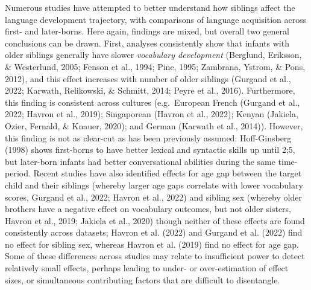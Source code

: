 \documentclass[
  man,mask,floatsintext]{apa6}
\begin{document}
Numerous studies have attempted to better understand how siblings affect the language development trajectory, with comparisons of language acquisition across first- and later-borns. Here again, findings are mixed, but overall two general conclusions can be drawn. First, analyses consistently show that infants with older siblings generally have slower \emph{vocabulary development} (Berglund, Eriksson, \& Westerlund, 2005; Fenson et al., 1994; Pine, 1995; Zambrana, Ystrom, \& Pons, 2012), and this effect increases with number of older siblings (Gurgand et al., 2022; Karwath, Relikowski, \& Schmitt, 2014; Peyre et al., 2016). Furthermore, this finding is consistent across cultures (e.g.~European French (Gurgand et al., 2022; Havron et al., 2019); Singaporean (Havron et al., 2022); Kenyan (Jakiela, Ozier, Fernald, \& Knauer, 2020); and German (Karwath et al., 2014)). However, this finding is not as clear-cut as has been previously assumed: Hoff-Ginsberg (1998) shows first-borns to have better lexical and syntactic skills up until 2;5, but later-born infants had better conversational abilities during the same time-period. Recent studies have also identified effects for age gap between the target child and their siblings (whereby larger age gaps correlate with lower vocabulary scores, Gurgand et al., 2022; Havron et al., 2022) and sibling sex (whereby older brothers have a negative effect on vocabulary outcomes, but not older sisters, Havron et al., 2019; Jakiela et al., 2020) though neither of these effects are found consistently across datasets; Havron et al. (2022) and Gurgand et al. (2022) find no effect for sibling sex, whereas Havron et al. (2019) find no effect for age gap. Some of these differences across studies may relate to insufficient power to detect relatively small effects, perhaps leading to under- or over-estimation of effect sizes, or simultaneous contributing factors that are difficult to disentangle.
\end{document}
